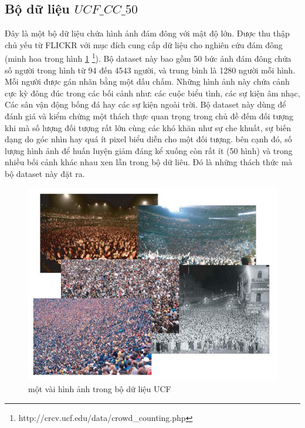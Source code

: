 \subsection{Bộ dữ liệu $UCF\_CC\_50$}
	Đây là một bộ dữ liệu chứa hình ảnh đám đông với mật độ lớn. Được thu thập chủ yếu từ FLICKR với mục đích cung cấp dữ liệu cho nghiên cứu đám đông (minh hoa trong hình \ref{ucf} \footnote{http://crcv.ucf.edu/data/crowd\_counting.php}). Bộ dataset này bao gồm 50 bức ảnh đám đông chứa số người trong hình từ 94 đến 4543 người, và trung bình là 1280 người mỗi hình. Mỗi người được gán nhãn bằng một dấu chấm. Những hình ảnh này chứa cảnh cực kỳ đông đúc trong các bối cảnh như: các cuộc biểu tình, các sự kiện âm nhạc, Các sân vận động bống đá hay các sự kiện ngoài trời. Bộ dataset này dùng để đánh giá và kiểm chứng một thách thực quan trọng trong chủ đề đếm đối tượng khi mà số lượng đối tượng rất lớn cùng các khó khăn như sự che khuất, sự biến dạng do góc nhìn hay quá ít pixel biểu diễn cho một đối tượng. bên cạnh đó, số lượng hình ảnh để huấn luyện giảm đáng kể xuống còn rất ít (50 hình) và trong nhiều bối cảnh khác nhau xen lẫn trong bộ dữ liêu. Đó là những thách thức mà bộ dataset này đặt ra. \par 
	
\begin{figure}[ht]
  			\begin{center}
    				\includegraphics[scale=0.5]{ucf} 
    				\caption{một vài hình ảnh trong bộ dữ liệu UCF}
    				\label{ucf}
  			\end{center}
\end{figure}	

